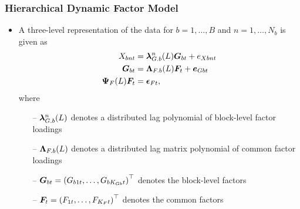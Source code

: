 \documentclass[10pt, compress, notheorems, aspectratio=169]{beamer}
\let\originalleft\left
\let\originalright\right
\renewcommand{\left}{\mathopen{}\mathclose \bgroup \originalleft}
\renewcommand{\right}{\aftergroup \egroup \originalright}
\begin{document}
\begin{frame}
	\frametitle{Hierarchical Dynamic Factor Model}
	\begin{itemize}
		\item A three-level representation of the data for $b = 1, \ldots, B$ and $n = 1, \ldots, N_b$ is given as 
			\begin{align}
				X_{bnt} &= {\bm \lambda}^n_{G.b} \left( L \right) {\bm G}_{bt} + e_{Xbnt} \\
				{\bm G}_{bt} &= {\bm \Lambda}_{F.b} \left( L \right) {\bm F}_t + {\bm e}_{Gbt} \\
				{\bm \Psi}_F \left( L \right) {\bm F}_t &= {\bm \epsilon}_{Ft},
			\end{align}
			where
			\begin{itemize}
				\item[--] ${\bm \lambda}^n_{G.b} \left( L \right)$ denotes a distributed lag polynomial of block-level factor loadings
				\item[--] ${\bm \Lambda}_{F.b} \left( L \right)$ denotes a distributed lag matrix polynomial of common factor loadings
				\item[--] ${\bm G}_{bt} = \left( G_{b1t}, \ldots, G_{bK_{Gb}t} \right)^{\top}$ denotes the block-level factors
				\item[--] ${\bm F}_t = \left( F_{1t}, \ldots, F_{K_F t} \right)^{\top}$ denotes the common factors
			\end{itemize}
	\end{itemize}
\end{frame}
\end{document}
